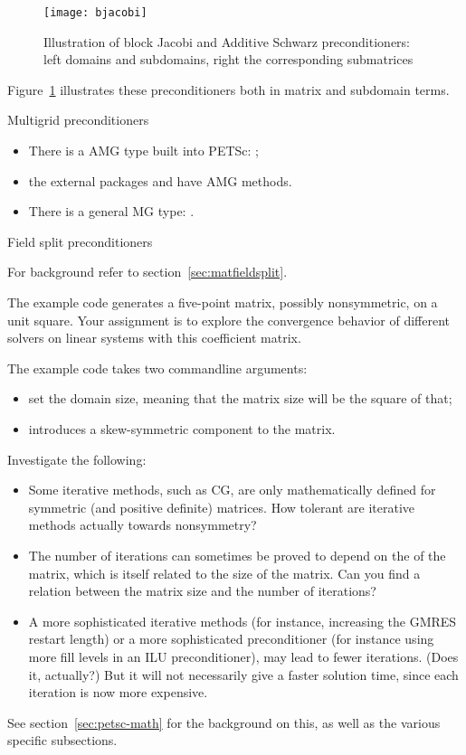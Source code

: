 \begin{figure}[ht]
  \texttt{[image: bjacobi]}
  \caption{Illustration of block Jacobi and Additive Schwarz preconditioners:
  left domains and subdomains, right the corresponding submatrices}
  \label{fig:bjacobi}
\end{figure}
Figure~\ref{fig:bjacobi} illustrates these preconditioners both in
matrix and subdomain terms.

 {Multigrid preconditioners}

\begin{itemize}
\item There is a \ac{AMG} type built into PETSc: ;
\item the external packages  and  have
  \ac{AMG} methods.
\item There is a general \ac{MG} type: .
\end{itemize}

 {Field split preconditioners}
\label{sec:pcfieldsplit}

For background refer to section~\ref{sec:matfieldsplit}.

\begin{exercise}
  \label{ex:petsc-ksp}
  The example code  generates a five-point matrix, possibly nonsymmetric,
  on a unit square.
  Your assignment is to explore the convergence behavior of different solvers
  on linear systems with this coefficient matrix.

  The example code takes two commandline arguments:
  \begin{itemize}
  \item {} set the domain size, meaning that the matrix size
    will be the square of that;
  \item {} introduces a skew-symmetric component to the matrix.
  \end{itemize}

  Investigate the following:
  \begin{itemize}
  \item Some iterative methods, such as \ac{CG}, are only
    mathematically defined for symmetric (and positive definite)
    matrices. How tolerant are iterative methods actually towards
    nonsymmetry?
  \item The number of iterations can sometimes be proved to depend
    on the  of the matrix, which is itself
    related to the size of the matrix. Can you find a relation between
    the matrix size and the number of iterations?
  \item A more sophisticated iterative methods (for instance,
    increasing the GMRES restart length) or a more sophisticated
    preconditioner (for instance using more fill levels in an ILU
    preconditioner), may lead to fewer iterations. (Does it, actually?)
    But it will not necessarily give a faster solution time,
    since each iteration is now more expensive.
  \end{itemize}
  See section~\ref{sec:petsc-math} for the background on this,
  as well as the various specific subsections.
\end{exercise}

